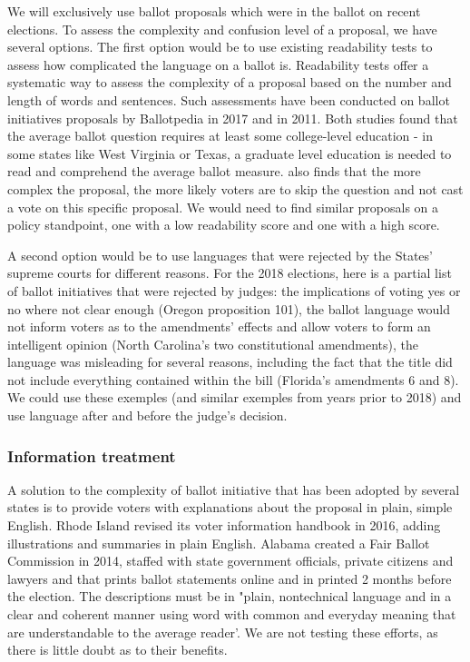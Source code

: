 \documentclass[12pt,final,fleqn]{article}
\theoremstyle{plain}
\begin{document}
We will exclusively use ballot proposals which were in the ballot on recent elections. To assess the complexity and confusion level of a proposal, we have several options. The first option would be to use existing readability tests to assess how complicated the language on a ballot is. Readability tests offer a systematic way to assess the complexity of a proposal based on the number and length of words and sentences. Such assessments have been conducted on ballot initiatives proposals by Ballotpedia in 2017 and \citet{kreilly2011ballot} in 2011. Both studies found that the average ballot question requires at least some college-level education - in some states like West Virginia or Texas, a graduate level education is needed to read and comprehend the average ballot measure. \citet{kreilly2011ballot} also finds that the more complex the proposal, the more likely voters are to skip the question and not cast a vote on this specific proposal. We would need to find similar proposals on a policy standpoint, one with a low readability score and one with a high score. 


A second option would be to use languages that were rejected by the States' supreme courts for different reasons. For the 2018 elections, here is a partial list of ballot initiatives that were rejected by judges: the implications of voting yes or no where not clear enough (Oregon proposition 101), the ballot language would not inform voters as to the amendments' effects and allow voters to form an intelligent opinion (North Carolina's two constitutional amendments), the language was misleading for several reasons, including the fact that the title did not include everything contained within the bill (Florida's amendments 6 and 8). We could use these exemples (and similar exemples from years prior to 2018) and use language after and before the judge's decision. 



\subsubsection{Information treatment} \label{sec: information-treatment}

A solution to the complexity of ballot initiative that has been adopted by several states is to provide voters with explanations about the proposal in plain, simple English. Rhode Island revised its voter information handbook in 2016, adding illustrations and summaries in plain English. Alabama created a Fair Ballot Commission in 2014, staffed with state government officials, private citizens and lawyers and that prints ballot statements online and in printed 2 months before the election. The descriptions must be in "plain, nontechnical language and in a clear and coherent manner using word with common and everyday meaning that are understandable to the average reader'. We are not testing these efforts, as there is little doubt as to their benefits. 
\end{document}
